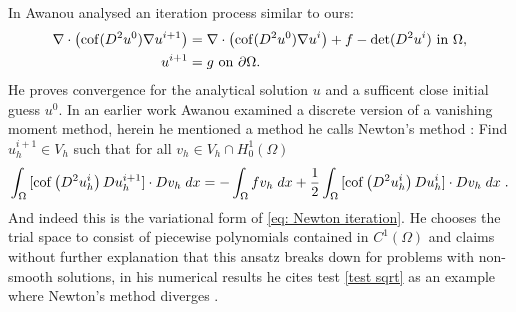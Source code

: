 In \cite{Awanou2014} Awanou analysed an iteration process similar to ours:
\begin{align}
	\nabla \cdot \left( \operatorname{cof}(D^2 u^0) \nabla u^{i+1} \right) &= \nabla \cdot \left( \operatorname{cof}(D^2 u^0) \nabla u^{i} \right) + f - \operatorname{det} (D^2u^i) \textnormal{ in } \Omega,  \label{eq: Awanout eq}\\
	u^{i+1} &= g \textnormal{ on } \partial \Omega.
\end{align}
He proves convergence for the analytical solution $u$ and a sufficent close initial guess $u^0$. 
In an earlier work \cite{Awanou2010} Awanou examined a discrete version of a vanishing moment method, herein he mentioned a method he calls Newton's method \cite[(1.3)]{Awanou2010}: Find $u_h^{i+1}\in V_h$ such that for all $v_h \in V_h \cap H^1_0 (\Omega)$
\[
	\int_{\Omega} {{[\operatorname{cof} \left(  D^2 u_h^i \right) Du_h^{i+1}] \cdot Dv_h}\;dx} 
	= -	\int_{\Omega} {{f v_h}\;dx} 
		+ \frac 1 2 \int_{\Omega} {{[\operatorname{cof} \left(  D^2 u_h^i \right) Du_h^{i}] \cdot Dv_h}\;dx} \;  \label{eq: Awanout eq2}.
\]
And indeed this is the variational form of \eqref{eq: Newton iteration}.
He chooses the trial space to consist of piecewise polynomials contained in $C^1(\Omega)$ and claims without further explanation that this ansatz breaks down for problems with non-smooth solutions\cite[Introduction]{Awanou2010}, in his numerical results he cites test \ref{test sqrt} as an example where Newton's method diverges \cite[Section 4.4]{Awanou2010}.

